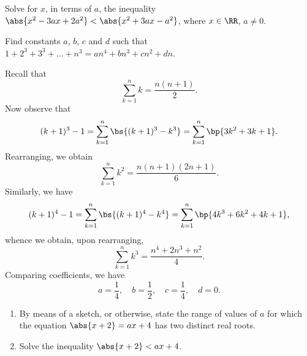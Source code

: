 \begin{problem}[C]
    Solve for $x$, in terms of $a$, the inequality $\abs{x^2 - 3ax + 2a^2} < \abs{x^2 + 3ax - a^2}$, where $x \in \RR$, $a \neq 0$.
\end{problem}

\begin{problem}[C]
    Find constants $a$, $b$, $c$ and $d$ such that $1 + 2^3 + 3^3 + \dots + n^3 = an^4 + bn^3 + cn^2 + dn$.
\end{problem}
\begin{solution}
    Recall that \[\sum_{k = 1}^n k = \frac{n(n+1)}{2}.\] Now observe that \[(k+1)^3 - 1 = \sum_{k = 1}^n \bs{(k+1)^3 - k^3} = \sum_{k = 1}^n \bp{3k^2 + 3k + 1}.\] Rearranging, we obtain \[\sum_{k = 1}^n k^2 = \frac{n(n+1)(2n+1)}6.\] Similarly, we have \[(k+1)^4 - 1 = \sum_{k = 1}^n \bs{(k+1)^4 - k^4} = \sum_{k = 1}^n \bp{4k^3 + 6k^2 + 4k + 1},\] whence we obtain, upon rearranging, \[\sum_{k = 1}^n k^3 = \frac{n^4 + 2n^3 + n^2}{4}.\] Comparing coefficients, we have \[a = \frac14, \quad b = \frac12, \quad c = \frac14, \quad d = 0.\]
\end{solution}

\begin{problem}[C]
    \begin{enumerate}
        \item By means of a sketch, or otherwise, state the range of values of $a$ for which the equation $\abs{x + 2} = ax + 4$ has two distinct real roots.
        \item Solve the inequality $\abs{x + 2} < ax + 4$.
    \end{enumerate}
\end{problem}